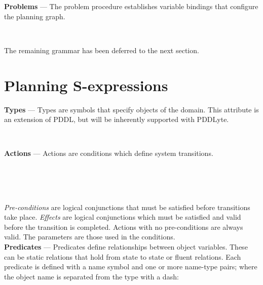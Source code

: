 \documentclass[
a4paper, %
11pt, %
onecolumn, %
openany, %
]{memoir}
\begin{document}
{\textbf{\small Problems} ---
The problem procedure establishes variable bindings that configure the planning graph.
\begin{bnf*}
\\
\end{bnf*}
The remaining grammar has been deferred to the next section.\\

\section{Planning S-expressions}
\textbf{\small Types} ---
Types are symbols that specify objects of the domain. This attribute is an extension of PDDL, but will be inherently supported with PDDLyte.
\begin{bnf*}
\\
\end{bnf*}

\textbf{\small Actions} ---
Actions are conditions which define system transitions. 
\begin{bnf*}
\\
\\
\\
\end{bnf*}
\textit{Pre-conditions} are logical conjunctions that must be satisfied before transitions take place. \textit{Effects} are logical conjunctions which must be  satisfied and valid before the transition is completed. Actions with no pre-conditions are always valid. The parameters are those used in the conditions.\\

\textbf{\small Predicates} ---
Predicates define relationships between object variables. These can be static relations that hold from state to state or fluent relations. Each predicate is defined with a name symbol and one or more name-type pairs; where the object name is separated from the type with a dash:
\begin{bnf*}
\end{bnf*}

}
\end{document}
